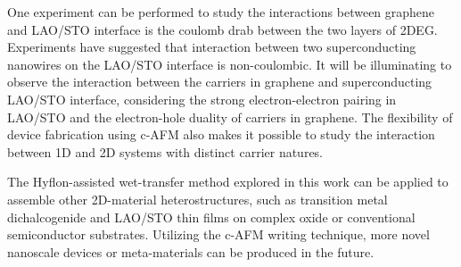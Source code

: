 \documentclass[pdflatex, sectionletters, 12pt]{pittetd}    %
\begin{document}
One experiment can be performed to study the interactions between graphene and LAO/STO interface is the coulomb drab between the two layers of 2DEG. Experiments have suggested that interaction between two superconducting nanowires on the LAO/STO interface is non-coulombic\cite{tang2017non}. It will be illuminating to observe the interaction between the carriers in graphene and superconducting LAO/STO interface, considering the strong electron-electron pairing in LAO/STO and the electron-hole duality of carriers in graphene. The flexibility of device fabrication using c-AFM also makes it possible to study the interaction between 1D and 2D systems with distinct carrier natures.

The Hyflon-assisted wet-transfer method explored in this work can be applied to assemble other 2D-material heterostructures, such as transition metal dichalcogenide and LAO/STO thin films on complex oxide or conventional semiconductor substrates. Utilizing the c-AFM writing technique, more novel nanoscale devices or meta-materials can be produced in the future.

%
%

% 

\end{document}
